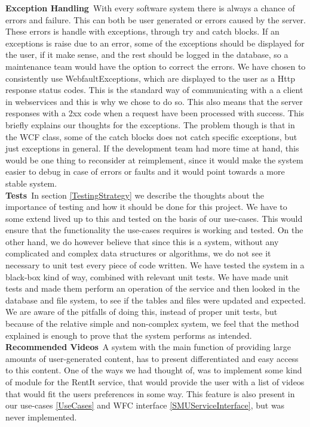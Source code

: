 \textbf{Exception Handling}\
 With every software system there is always a chance of errors and failure. This can both be user generated or errors caused by the server. These errors is handle with exceptions, through try and catch blocks. If an exceptions is raise due to an error, some of the exceptions should be displayed for the user, if it make sense, and the rest should be logged in the database, so a maintenance team would have the option to correct the errors. We have chosen to consistently use WebfaultExceptions, which are displayed to the user as a Http response status codes. This is the standard way of communicating with a a client in webservices and this is why we chose to do so. This also means that the server responses with a 2xx code when a request have been processed with success. This briefly explains our thoughts for the exceptions. The problem though is that in the WCF class, some of the catch blocks does not catch specific exceptions, but just exceptions in general. If the development team had more time at hand, this would be one thing to reconsider at reimplement, since it would make the system easier to debug in case of errors or faults and it would point towards a more stable system.\\
 
\textbf{Tests}\
 In section \ref{TestingStrategy} we describe the thoughts about the importance of testing and how it should be done for this project. We have to some extend lived up to this and tested on the basis of our use-cases. This would ensure that the functionality the use-cases requires is working and tested. On the other hand, we do however believe that since this is a system, without any complicated and complex data structures or algorithms, we do not see it necessary to unit test every piece of code written. We have tested the system in a black-box kind of way, combined with relevant unit tests. We have made unit tests and made them perform an operation of the service and then looked in the database and file system, to see if the tables and files were updated and expected. We are aware of the pitfalls of doing this, instead of proper unit tests, but because of the relative simple and non-complex system, we feel that the method explained is enough to prove that the system performs as intended.\\

\textbf{Recommended Videos}\
 A system with the main function of providing large amounts of user-generated content, has to present differentiated and easy access to this content. One of the ways we had thought of, was to implement some kind of module for the RentIt service, that would provide the user with a list of videos that would fit the users preferences in some way. This feature is also present in our use-cases \ref{UseCases} and WFC interface \ref{SMUServiceInterface}, but was never implemented.\

